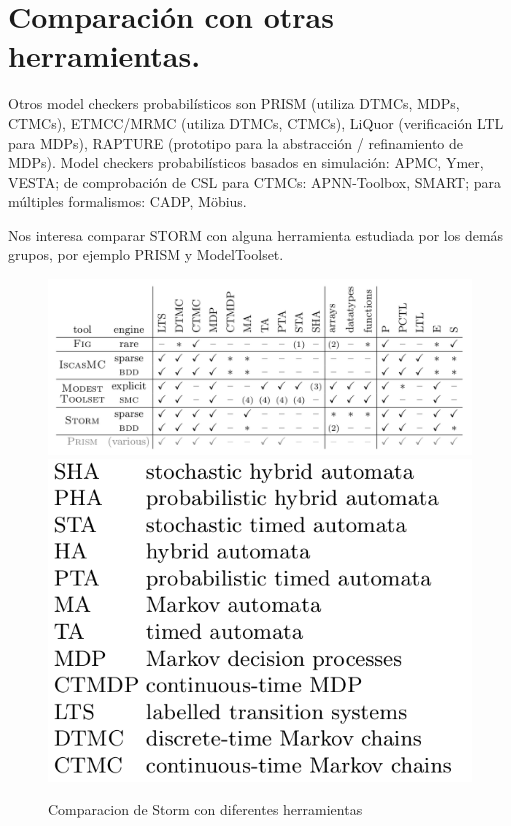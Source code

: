 \documentclass[11pt]{article}
\begin{document}
\section{Comparaci\'on con otras herramientas.}

Otros model checkers probabil\'isticos son PRISM (utiliza DTMCs, MDPs, CTMCs), ETMCC/MRMC (utiliza DTMCs, CTMCs), LiQuor (verificaci\'on LTL para MDPs), RAPTURE (prototipo para la abstracci\'on / refinamiento de MDPs). Model checkers probabil\'isticos basados en simulaci\'on: APMC, Ymer, VESTA; de comprobaci\'on de CSL para CTMCs: APNN-Toolbox, SMART; para m\'ultiples formalismos: CADP, M\"{o}bius.

Nos interesa comparar STORM con alguna herramienta estudiada por los dem\'as grupos, por ejemplo PRISM y ModelToolset.  

\begin{figure}[h]
	\includegraphics[scale=0.28]{comparacion.png} 
	\includegraphics[scale=0.27]{significado.png} 
	\centering
	\caption{Comparacion de Storm con diferentes herramientas}%

\end{figure}
\end{document}
